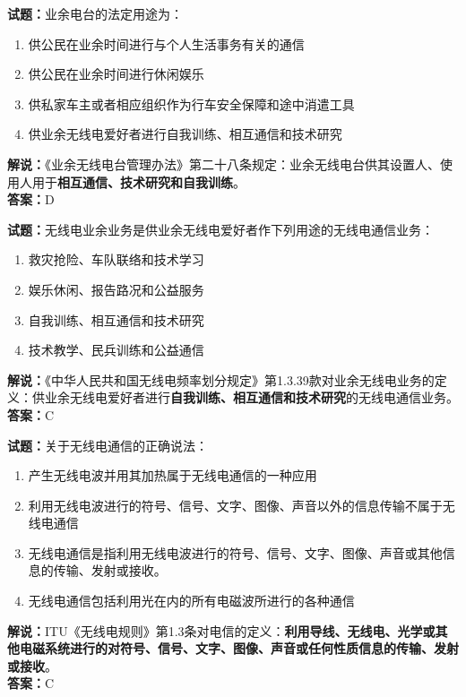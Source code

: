 \documentclass{ctexbook}
\begin{document}
\bigskip

\noindent\textbf{试题：}业余电台的法定用途为：
\begin{enumerate}[leftmargin=3em]
  \item 供公民在业余时间进行与个人生活事务有关的通信
  \item 供公民在业余时间进行休闲娱乐
  \item 供私家车主或者相应组织作为行车安全保障和途中消遣工具
  \item 供业余无线电爱好者进行自我训练、相互通信和技术研究
\end{enumerate}
\noindent\textbf{解说：}《业余无线电台管理办法》第二十八条规定：业余无线电台供其设置人、使用人用于\textbf{相互通信、技术研究和自我训练}。\\\noindent\textbf{答案：}D

\bigskip

\noindent\textbf{试题：}无线电业余业务是供业余无线电爱好者作下列用途的无线电通信业务：
\begin{enumerate}[leftmargin=3em]
  \item 救灾抢险、车队联络和技术学习
  \item 娱乐休闲、报告路况和公益服务
  \item 自我训练、相互通信和技术研究
  \item 技术教学、民兵训练和公益通信
\end{enumerate}
\noindent\textbf{解说：}《中华人民共和国无线电频率划分规定》第1.3.39款对业余无线电业务的定义：供业余无线电爱好者进行\textbf{自我训练、相互通信和技术研究}的无线电通信业务。\\\noindent\textbf{答案：}C

\bigskip

\noindent\textbf{试题：}关于无线电通信的正确说法：
\begin{enumerate}[leftmargin=3em]
  \item 产生无线电波并用其加热属于无线电通信的一种应用
  \item 利用无线电波进行的符号、信号、文字、图像、声音以外的信息传输不属于无线电通信
  \item 无线电通信是指利用无线电波进行的符号、信号、文字、图像、声音或其他信息的传输、发射或接收。
  \item 无线电通信包括利用光在内的所有电磁波所进行的各种通信
\end{enumerate}
\noindent\textbf{解说：}ITU《无线电规则》第1.3条对电信的定义：\textbf{利用导线、无线电、光学或其他电磁系统进行的对符号、信号、文字、图像、声音或任何性质信息的传输、发射或接收}。\\\noindent\textbf{答案：}C
\end{document}
